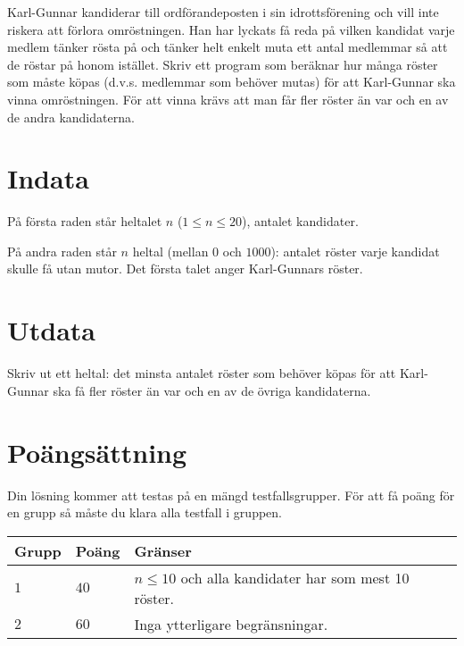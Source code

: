 
Karl-Gunnar kandiderar till ordförandeposten i sin idrottsförening och vill inte riskera att förlora omröstningen.
Han har lyckats få reda på vilken kandidat varje medlem tänker rösta på och tänker helt enkelt muta ett antal
medlemmar så att de röstar på honom istället. Skriv ett program som beräknar hur många röster som måste köpas
(d.v.s. medlemmar som behöver mutas) för att Karl-Gunnar ska vinna omröstningen. För att vinna krävs att man
får fler röster än var och en av de andra kandidaterna.

\section*{Indata}
På första raden står heltalet $n$ ($1 \le n \le 20$), antalet kandidater.

På andra raden står $n$ heltal (mellan $0$ och $1000$): antalet röster varje kandidat skulle få utan mutor.
Det första talet anger Karl-Gunnars röster.

\section*{Utdata}

Skriv ut ett heltal: det minsta antalet röster som behöver köpas för att Karl-Gunnar ska få fler
röster än var och en av de övriga kandidaterna.

\section*{Poängsättning}
Din lösning kommer att testas på en mängd testfallsgrupper.
För att få poäng för en grupp så måste du klara alla testfall i gruppen.

\noindent
\begin{tabular}{| l | l | p{12cm} |}
  \hline
  \textbf{Grupp} & \textbf{Poäng} & \textbf{Gränser} \\ \hline
  $1$    & $40$       & $n \leq 10$ och alla kandidater har som mest 10 röster. \\ \hline
  $2$    & $60$       & Inga ytterligare begränsningar. \\ \hline
\end{tabular}
